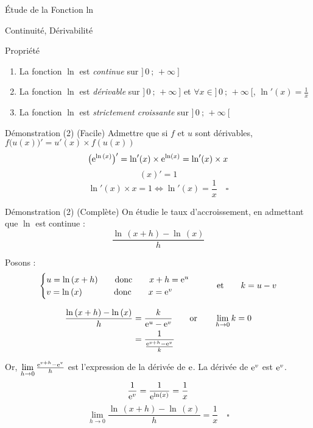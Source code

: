 \documentclass{cours}
\begin{document}
    \begin{Gpartie}{Étude de la Fonction ln}
        \begin{Spartie}{Continuité, Dérivabilité}
            \begin{SSpartie}{Propriété}
                \begin{enumerate}[(1)]
                    \item La fonction $\ln$ est \emph{continue} sur $\big]\,0~;\,+\infty~\big]$
                    \item La fonction $\ln$ est \emph{dérivable} sur $\big]\,0~;\,+\infty~\big]$ et $\forall x\in\big]\,0~;\,+\infty~\big[$, $\boxed{\ln'(x)=\frac{1}{x}}$
                    \item La fonction $\ln$ est \emph{strictement croissante} sur $\big]\,0~;\,+\infty~\big[$
                \end{enumerate}
                \begin{SSSpartie}{Démonstration (2) (Facile)}
                    Admettre que si $f$ et $u$ sont dérivables, $f\big(u(x)\big)'=u'(x)\times f(u(x))$
                    \[\big(\mathrm{e}^{\ln\,(x)}\big)'=\ln'(x)\times \mathrm{e}^{\ln(x)}=\ln'(x)\times x\]
                    \[(x)'=1\]
                    \[\ln'(x)\times x=1\iff\ln'(x)=\frac{1}{x}\quad\square\]
                    
                \end{SSSpartie}
                \begin{SSSpartie}{Démonstration (2) (Complète)} 
                    On étudie le taux d'accroissement, en admettant que $\ln$ est continue :
                    \[\frac{\ln\,(x+h)-\ln\,(x)}{h}\]

                    Posons :
                    \[\begin{cases}
                        u=\ln\,(x+h)\qquad\text{donc}\qquad x+h=\mathrm{e}^u \\ v=\ln\,(x)\phantom{+h)}\text{\qquad donc\qquad} x=\mathrm{e}^v
                    \end{cases}\qquad\text{et}\qquad k=u-v\]

                    \[\begin{aligned}[t]
                        \frac{\ln\,(x+h)-\ln\,(x)}{h}&=\frac{k}{\mathrm{e}^u-\mathrm{e}^v}\qquad\text{or}\qquad\lim_{h\to0}k=0 \\
                        &=\frac{1}{\frac{\mathrm{e}^{v+h}-\mathrm{e}^v}{k}}
                    \end{aligned}\]

                    Or, $\lim\limits_{h\to0}\frac{\mathrm{e}^{v+h}-\mathrm{e}^v}{h}$ est l'expression de la dérivée de $\mathrm{e}$. La dérivée de $\mathrm{e}^v$ est $\mathrm{e}^v$.
                    \[\frac{1}{\mathrm{e}^v}=\frac{1}{\mathrm{e}^{\ln(x)}}=\frac{1}{x}\]
                    \[\lim\limits_{h\to 0}\frac{\ln\,(x+h)-\ln\,(x)}{h}=\frac{1}{x}\quad\square\]


\end{SSSpartie}
\end{SSpartie}
\end{Spartie}
\end{Gpartie}
\end{document}
